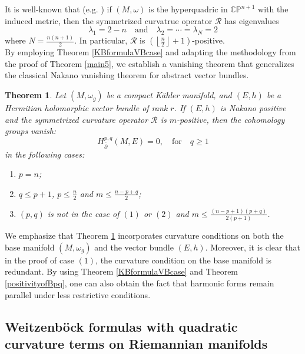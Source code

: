\documentclass[12pt, reqno]{amsart}
\theoremstyle{plain}
\newtheorem{thm}{Theorem}[section]
\theoremstyle{definition}
\newcommand{\btheorem}{\begin{thm}}
\newcommand{\etheorem}{\end{thm}}
\newcommand{\p}{\partial}
\renewcommand{\bar}{\overline}
\newcommand{\bd}{\begin{enumerate}}
\newcommand{\ed}{\end{enumerate}}
\newcommand{\qtq}[1]{\quad\mbox{#1}\quad}
\renewcommand{\>}{\rightarrow}
\newcommand{\C}{{\mathbb C}}
\renewcommand{\P}{{\mathbb P}}
\renewcommand{\#}{\sharp}
\numberwithin{equation}{section} %
\begin{document}
\noindent  It is well-known that (e.g. \cite{CV60}) if $(M,\omega)$ is the hyperquadric in $\C\P^{n+1}$ with the induced metric, then the  symmetrized curvatrue operator $ \mathcal{R} $ has eigenvalues  $$ \lambda_1 = 2-n  \qtq{and} \lambda_2 = \cdots = \lambda_{N} = 2 $$  where $ N = \frac{n(n+1)}{2} $. In particular, $\mathcal R$ is $\left(\left\lfloor \frac{n}{2}\right\rfloor+1\right) $-positive.\\



    \noindent   By employing Theorem \ref{KBformulaVBcase} and adapting the methodology from the proof of Theorem \ref{main5}, we establish a vanishing theorem that generalizes the classical Nakano vanishing theorem for abstract vector bundles.

    \btheorem\label{main7} Let $(M,\omega_g)$ be a compact K\"ahler manifold, and $(E,h)$ be a Hermitian holomorphic vector bundle of rank $r$.  If $ (E,h)$ is Nakano positive and the symmetrized curvature operator $ \mathcal{R} $ is $ m $-positive, then the cohomology groups vanish: $$ H_{\bar\p}^{p,q}(M,E) = 0, \qtq{for} q \geq 1 $$ in the following cases:
    \bd
    \item  $ p = n $;
    \item  $ q \leq p + 1 $, $ p \leq \frac{n}{2} $ and $ m\leq \frac{n-p+q}{2} $;
    \item $(p,q)$ is not in the case of $(1)$ or $(2)$ and $ m \leq \frac{(n-p+1)(p+q)}{2(p+1)} $.
    \ed
    \etheorem

    \noindent We emphasize that Theorem \ref{main7} incorporates curvature conditions on both the base manifold $(M,\omega_g)$ and the vector bundle
    $(E,h)$. Moreover, it is clear that  in the proof of case $(1)$, the curvature condition on the base manifold is redundant.  By using Theorem \ref{KBformulaVBcase} and Theorem \ref{positivityofBpq}, one can also obtain the fact that harmonic forms remain parallel under less restrictive conditions.


\baselineskip
    \subsection{Weitzenb\"ock formulas with quadratic curvature terms  on  Riemannian manifolds}
\end{document}
